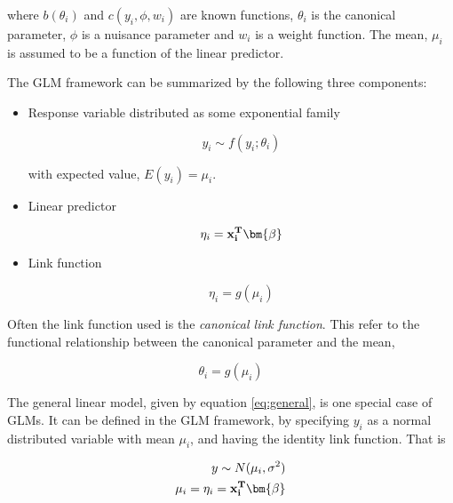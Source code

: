 where $b(\theta_i)$ and $c(y_i,\phi,w_i)$ are known functions, $\theta_i$ is the canonical parameter, $\phi$ is a nuisance parameter and $w_i$ is a weight function. The mean, $\mu_i$ is assumed to be a function of the linear predictor.

The GLM framework can be summarized by the following three components:

\begin{itemize}

\item Response variable distributed as some exponential family

\begin{equation}
    y_{i} \sim f(y_i;\theta_i)
\end{equation}

with expected value, $E(y_i) = \mu_i$.

\item Linear predictor

\begin{equation}
    \eta_i = \bf x_i^T \bm{ \beta}
\end{equation}

\item Link function

\begin{equation}
    \eta_i = g(\mu_i)
\end{equation}

\end{itemize}




Often the link function used is the \textit{canonical link function}. This refer to the functional relationship between the canonical parameter and the mean,

\begin{equation}
\theta_i = g(\mu_i)
\end{equation}

The general linear model, given by equation \ref{eq:general}, is one special case of GLMs. It can be defined in the GLM framework, by specifying $y_i$ as a normal distributed variable with mean $\mu_i$, and having the identity link function. That is

\begin{equation}
\begin{split}
y \sim N(\mu_i, \sigma^2) \\
\mu_i = \eta_i = \bf x_i^T \bm{ \beta}
\end{split}
\end{equation}


